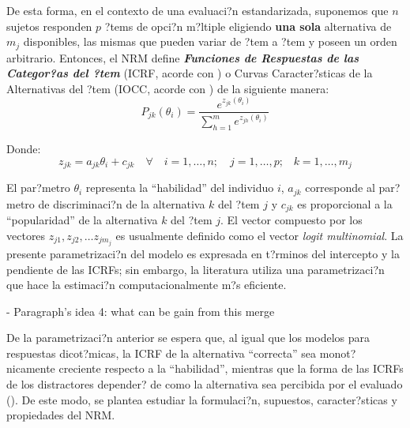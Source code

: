 De esta forma, en el contexto de una evaluaci?n estandarizada, suponemos que $n$ sujetos responden $p$ ?tems de opci?n m?ltiple eligiendo \textbf{una sola} alternativa de $m_j$ disponibles, las mismas que pueden variar de ?tem a ?tem y poseen un orden arbitrario. Entonces, el NRM define \textbf{\textit{Funciones de Respuestas de las Categor?as del ?tem}} (ICRF, acorde con \citealp{Ostini2006}) o Curvas Caracter?sticas de la Alternativas del ?tem (IOCC, acorde con \citealp{Ham_Swam1991}) de la siguiente manera:
\begin{equation}
	P_{jk}(\theta_i) = \dfrac{e^{z_{jk}(\theta_i)}}{\sum_{h=1}^{m}e^{z_{jh}(\theta_i)}} 
\end{equation}

Donde:
\begin{equation*}
z_{jk} = a_{jk}\theta_i + c_{jk} \quad \forall \quad i = 1, \dots, n; \quad j = 1, \dots, p \text{;} \quad k = 1, \dots, m_j
\end{equation*}

El par?metro $\theta_i$ representa la ``habilidad'' del individuo $i$, $a_{jk}$ corresponde al par?metro de discriminaci?n de la alternativa $k$ del ?tem $j$ y $c_{jk}$ es proporcional a la ``popularidad'' de la alternativa $k$ del ?tem $j$. El vector compuesto por los vectores $z_{j1}, z_{j2}, \dots z_{j m_j}$ es usualmente definido como el vector \textit{logit multinomial}. La presente parametrizaci?n del modelo es expresada en t?rminos del intercepto y la pendiente de las ICRFs; sin embargo, la literatura utiliza una parametrizaci?n que hace la estimaci?n computacionalmente m?s eficiente.



- Paragraph's idea 4: what can be gain from this merge

De la parametrizaci?n anterior se espera que, al igual que los modelos para respuestas dicot?micas, la ICRF de la alternativa ``correcta'' sea monot?nicamente creciente respecto a la ``habilidad'', mientras que la forma de las ICRFs de los distractores depender? de como la alternativa sea percibida por el evaluado (\citealp{Ham_Swam1991}). De este modo, se plantea estudiar la formulaci?n, supuestos, caracter?sticas y propiedades del NRM.

